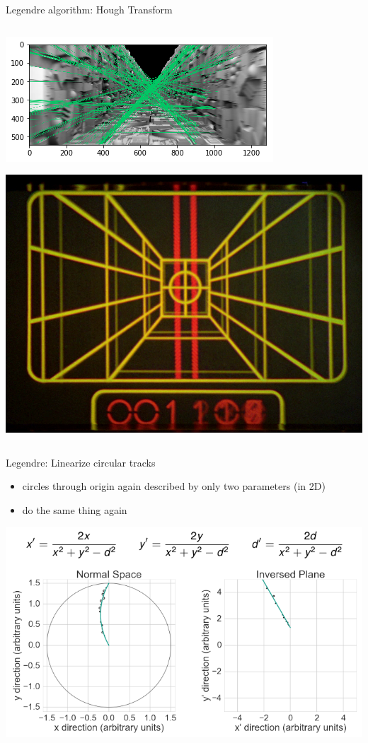 \documentclass[presentation]{etp-beamer-fancy}
\begin{document}
\begin{frame}[label={sec:orgf9b2e2d},fragile]{Legendre algorithm: Hough Transform}
\begin{columns}
\begin{column}{0.3\columnwidth}
\begin{center}
\end{center}
\begin{center}
\includegraphics[width=.9\linewidth]{./figures/deathstar_trench_hough.png}
\end{center}
\begin{center}
\includegraphics[width=.9\linewidth]{./figures/death-star-trench-hud.png}
\end{center}
\end{column}
\end{columns}
\end{frame}
\begin{frame}[label={sec:org44be6a9}]{Legendre: Linearize circular tracks}
\begin{itemize}
\item circles through origin again described by only two parameters (in 2D)
\item do the same thing again
\end{itemize}
\begin{center}
\includegraphics[width=.7\textwidth]{./figures/legendre_inverted_plane.png}
\end{center}
\end{frame}
\end{document}
